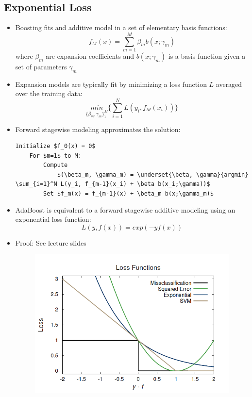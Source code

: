\subsection*{Exponential Loss}
\begin{itemize}
    \item
        Boosting fits and additive model in a set of elementary basis functions:
        $$ f_M(x) = \sum_{m=1}^M \beta_m b(x; \gamma_m)$$
        where $\beta_m$ are expansion coefficients and $b(x; \gamma_m)$ is a basis function given a set of parameters $\gamma_m$
    \item
        Expansion models are typically fit by minimizing a loss function $L$ averaged over the training data:
        $$ \underset{\{\beta_m, \gamma_m\}_1^M}{min} \{\sum_{i=1}^{N} L(y_i, f_M(x_i))\}$$
    \item
        Forward stagewise modeling approximates the solution:
\begin{lstlisting}[mathescape]
    Initialize $f_0(x) = 0$
    For $m=1$ to M:
        Compute
            $(\beta_m, \gamma_m) = \underset{\beta, \gamma}{argmin} \sum_{i=1}^N L(y_i, f_{m-1}(x_i) + \beta b(x_i;\gamma))$
        Set $f_m(x) = f_{m-1}(x) + \beta_m b(x;\gamma_m)$
\end{lstlisting}
    \item
        AdaBoost is equivalent to a forward stagewise additive modeling using an exponential loss function:
        $$L(y, f(x)) = exp(-y f(x))$$
    \item
        Proof: See lecture slides
        \begin{figure}[H]
            \centering
            \includegraphics[scale=0.7]{figures/loss_funcs}

\end{figure}
\end{itemize}
